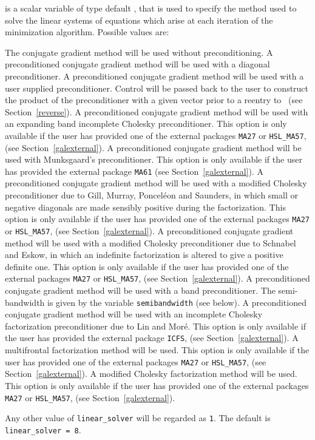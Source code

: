 \documentclass{galahad}
\begin{document}
\begin{description}
 is a scalar variable of type default \integer, that
is used to specify the method used to solve the linear systems of equations
which arise at each iteration of the minimization algorithm.
 Possible values are:
\begin{description}
    The conjugate gradient method will be used without preconditioning.
    A preconditioned conjugate gradient
    method will be used with a diagonal
    preconditioner.
    A preconditioned conjugate gradient
    method will be used with a user supplied
    preconditioner. Control will be passed back to the user to
    construct the product of the preconditioner with a given
    vector prior to a reentry to \solver\
    (see Section~\ref{reverse}).
    A preconditioned conjugate gradient
    method will be used with an expanding band
    incomplete Cholesky preconditioner.
    This option is only available if the user has provided one of the
    external packages {\tt MA27} or {\tt HSL\_MA57},
    (see Section~\ref{galexternal}).
    A preconditioned conjugate gradient
    method will be used with Munksgaard's
    preconditioner.
    This option is only available if the user has provided the
    external package {\tt MA61}
    (see Section~\ref{galexternal}).
    A preconditioned conjugate gradient
    method will be used with a modified Cholesky
    preconditioner due to Gill, Murray, Poncel\'{e}on and Saunders,
    in which small or negative diagonals are
    made sensibly positive during the factorization.
    This option is only available if the user has provided one of the
    external packages {\tt MA27} or {\tt HSL\_MA57},
    (see Section~\ref{galexternal}).
    A preconditioned conjugate gradient
    method will be used with a modified Cholesky
    preconditioner due to Schnabel and Eskow, in which an indefinite
    factorization is altered to give a positive definite one.
    This option is only available if the user has provided one of the
    external packages {\tt MA27} or {\tt HSL\_MA57},
    (see Section~\ref{galexternal}).
    A preconditioned conjugate gradient
    method will be used with a band
    preconditioner. The semi-bandwidth
    is given by the variable {\tt semibandwidth} (see below).
    A preconditioned conjugate gradient
    method will be used with an incomplete Cholesky factorization
    preconditioner due to Lin and Mor\'{e}.
    This option is only
    available if the user has provided the external package {\tt ICFS},
    (see Section~\ref{galexternal}).
    A multifrontal factorization method will be used.
    This option is only available if the user has provided one of the
    external packages {\tt MA27} or {\tt HSL\_MA57},
    (see Section~\ref{galexternal}).
    A modified Cholesky factorization method will be used.
    This option is only available if the user has provided one of the
    external packages {\tt MA27} or {\tt HSL\_MA57},
    (see Section~\ref{galexternal}).
\end{description}
Any other value of {\tt linear\_solver} will be regarded as {\tt 1}.
The default is {\tt linear\_solver = 8}.


\end{description}
\end{document}
